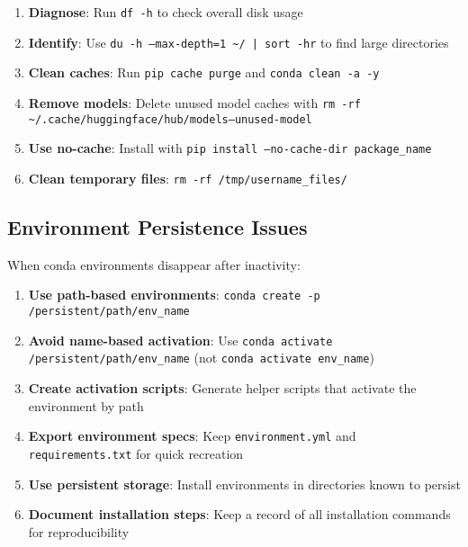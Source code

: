 \documentclass{article}
\begin{document}
\begin{tcolorbox}[colback=red!5!white, colframe=red!75!black, title=Disk Space Troubleshooting]
\begin{enumerate}
    \item \textbf{Diagnose}: Run \texttt{df -h} to check overall disk usage
    \item \textbf{Identify}: Use \texttt{du -h --max-depth=1 \textasciitilde/ | sort -hr} to find large directories
    \item \textbf{Clean caches}: Run \texttt{pip cache purge} and \texttt{conda clean -a -y}
    \item \textbf{Remove models}: Delete unused model caches with \texttt{rm -rf \textasciitilde/.cache/huggingface/hub/models--unused-model}
    \item \textbf{Use no-cache}: Install with \texttt{pip install --no-cache-dir package\_name}
    \item \textbf{Clean temporary files}: \texttt{rm -rf /tmp/username\_files/}
\end{enumerate}
\end{tcolorbox}

\subsection{Environment Persistence Issues}
When conda environments disappear after inactivity:

\begin{tcolorbox}[colback=red!5!white, colframe=red!75!black, title=Environment Persistence Solutions]
\begin{enumerate}
    \item \textbf{Use path-based environments}: \texttt{conda create -p /persistent/path/env\_name}
    \item \textbf{Avoid name-based activation}: Use \texttt{conda activate /persistent/path/env\_name} (not \texttt{conda activate env\_name})
    \item \textbf{Create activation scripts}: Generate helper scripts that activate the environment by path
    \item \textbf{Export environment specs}: Keep \texttt{environment.yml} and \texttt{requirements.txt} for quick recreation
    \item \textbf{Use persistent storage}: Install environments in directories known to persist
    \item \textbf{Document installation steps}: Keep a record of all installation commands for reproducibility
\end{enumerate}
\end{tcolorbox}
\end{document}
